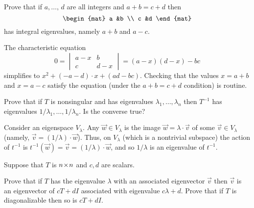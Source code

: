 \begin{exercises}
\begin{answer}
    \end{answer}
  \item 
    Prove that if $a,\ldots,\,d$ are all integers and \( a+b=c+d \) then
    \begin{equation*}
      \begin{mat}
         a  &b  \\
         c  &d
      \end{mat}
    \end{equation*}
    has integral eigenvalues, namely \( a+b \) and \( a-c \).
    \begin{answer}
      The characteristic equation 
      \begin{equation*}
        0=
        \begin{vmatrix}
          a-x  &b  \\
          c    &d-x 
        \end{vmatrix}
        =(a-x)(d-x)-bc
      \end{equation*}
      simplifies to $x^2+(-a-d)\cdot x + (ad-bc)$.
      Checking that the values $x=a+b$ and $x=a-c$ satisfy the equation 
      (under the $a+b=c+d$ condition) is routine. 
    \end{answer}
  \recommended \item
    Prove that if \( T \) is nonsingular and has eigenvalues
    \( \lambda_1,\dots,\lambda_n \) then \( T^{-1} \) has eigenvalues
    \( 1/\lambda_1,\dots,1/\lambda_n \).
    Is the converse true?
    \begin{answer}
      Consider an eigenspace $V_{\lambda}$.
      Any $\vec{w}\in V_{\lambda}$ is the image
      $\vec{w}=\lambda\cdot\vec{v}$ of some $\vec{v}\in V_{\lambda}$ 
      (namely, $\vec{v}=(1/\lambda)\cdot\vec{w}$).
      Thus, on $V_{\lambda}$ (which is a nontrivial subspace) 
      the action of $t^{-1}$ is 
      $t^{-1}(\vec{w})=\vec{v}=(1/\lambda)\cdot\vec{w}$,
      and so $1/\lambda$ is an eigenvalue of $t^{-1}$.
    \end{answer}
  \recommended \item
    Suppose that \( T \) is \( n \! \times \! n \) and \( c,d \) are scalars.
    \begin{exparts}
      \partsitem Prove that if \( T \) has the eigenvalue 
        \( \lambda \) with an associated
        eigenvector \( \vec{v} \) then \( \vec{v} \) is an eigenvector of
        \( cT+dI \) associated with eigenvalue \( c\lambda+d \).
      \partsitem Prove that if \( T \) is diagonalizable then so is
        \( cT+dI \).
    \end{exparts}

\end{exercises}
